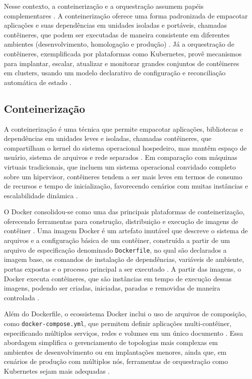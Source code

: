 Nesse contexto, a conteinerização e a orquestração assumem papéis complementares \cite{docker2026documentation,kubernetes2026documentation}. A conteinerização oferece uma forma padronizada de empacotar aplicações e suas dependências em unidades isoladas e portáveis, chamadas contêineres, que podem ser executadas de maneira consistente em diferentes ambientes (desenvolvimento, homologação e produção) \cite{docker2026documentation}. Já a orquestração de contêineres, exemplificada por plataformas como Kubernetes, provê mecanismos para implantar, escalar, atualizar e monitorar grandes conjuntos de contêineres em clusters, usando um modelo declarativo de configuração e reconciliação automática de estado \cite{kubernetes2026documentation}.



\subsection{Conteinerização}

A conteinerização é uma técnica que permite empacotar aplicações, bibliotecas e dependências em unidades leves e isoladas, chamadas contêineres, que compartilham o kernel do sistema operacional hospedeiro, mas mantêm espaço de usuário, sistema de arquivos e rede separados \cite{docker2026documentation}. Em comparação com máquinas virtuais tradicionais, que incluem um sistema operacional convidado completo sobre um hipervisor, contêineres tendem a ser mais leves em termos de consumo de recursos e tempo de inicialização, favorecendo cenários com muitas instâncias e escalabilidade dinâmica \cite{docker2026documentation}.

O Docker consolidou-se como uma das principais plataformas de conteinerização, oferecendo ferramentas para construção, distribuição e execução de imagens de contêiner \cite{docker2026documentation}. Uma imagem Docker é um artefato imutável que descreve o sistema de arquivos e a configuração básica de um contêiner, construída a partir de um arquivo de especificação denominado \texttt{Dockerfile}, no qual são declarados a imagem base, os comandos de instalação de dependências, variáveis de ambiente, portas expostas e o processo principal a ser executado \cite{docker2026documentation}. A partir das imagens, o Docker executa contêineres, que são instâncias em tempo de execução dessas imagens, podendo ser criadas, iniciadas, paradas e removidas de maneira controlada \cite{docker2026documentation}.

Além do Dockerfile, o ecossistema Docker inclui o uso de arquivos de composição, como \texttt{docker-compose.yml}, que permitem definir aplicações multi-contêiner, especificando múltiplos serviços, redes e volumes em um único documento \cite{docker2026documentation}. Essa abordagem simplifica o gerenciamento de topologias mais complexas em ambientes de desenvolvimento ou em implantações menores, ainda que, em cenários de produção com múltiplos nós, ferramentas de orquestração como Kubernetes sejam mais adequadas \cite{burns2019}.

